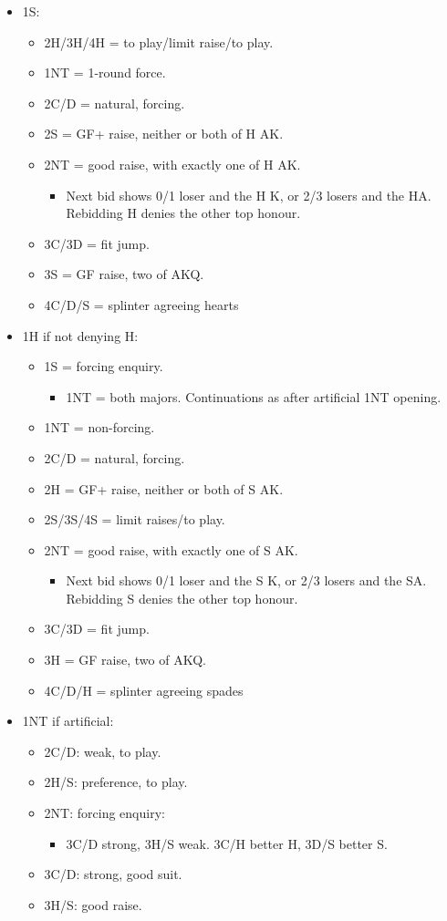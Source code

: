 \documentclass[a4paper,12pt]{article}
\begin{document}
\begin{itemize}
\item 1S:
	\begin{itemize}
   \item 2H/3H/4H = to play/limit raise/to play.
   \item 1NT = 1-round force.
   \item 2C/D = natural, forcing.
   \item 2S = GF+ raise, neither or both of H AK.
   \item 2NT = good raise, with exactly one of H AK.
		\begin{itemize}
      \item Next bid shows 0/1 loser and the H K, or 2/3 losers and the HA.
         Rebidding H denies the other top honour.
		\end{itemize}
   \item 3C/3D = fit jump.
   \item 3S = GF raise, two of AKQ.
   \item 4C/D/S = splinter agreeing hearts
	\end{itemize}

\item 1H if not denying H:
	\begin{itemize}
   \item 1S = forcing enquiry.
		\begin{itemize}
      \item 1NT = both majors. Continuations as after artificial 1NT opening.
		\end{itemize}
   \item 1NT = non-forcing.
   \item 2C/D = natural, forcing.
   \item 2H = GF+ raise, neither or both of S AK.
   \item 2S/3S/4S = limit raises/to play.
   \item 2NT = good raise, with exactly one of S AK.
		\begin{itemize}
      \item Next bid shows 0/1 loser and the S K, or 2/3 losers and the SA.
         Rebidding S denies the other top honour.
		\end{itemize}
   \item 3C/3D = fit jump.
   \item 3H = GF raise, two of AKQ.
   \item 4C/D/H = splinter agreeing spades
	\end{itemize}

\item 1NT if artificial:
	\begin{itemize}
   \item 2C/D: weak, to play.
   \item 2H/S: preference, to play.
   \item 2NT: forcing enquiry:
		\begin{itemize}
      \item 3C/D strong, 3H/S weak. 3C/H better H, 3D/S better S.
		\end{itemize}
   \item 3C/D: strong, good suit.
   \item 3H/S: good raise.
	\end{itemize}


\end{itemize}
\end{document}
